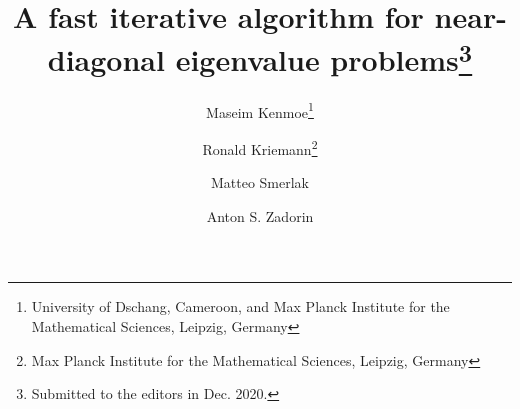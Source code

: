 

\usepackage{lipsum}
\usepackage{amsfonts}
\usepackage{graphicx}
\usepackage{epstopdf}
\usepackage{algorithmic}
\usepackage{cleveref}



\title{A fast iterative algorithm for  near-diagonal eigenvalue problems\thanks{Submitted to the editors in Dec. 2020. }}

\author{Maseim Kenmoe\thanks{University of Dschang, Cameroon, and Max Planck Institute for the Mathematical Sciences, Leipzig, Germany}
\and Ronald Kriemann\thanks{Max Planck Institute for the Mathematical Sciences, Leipzig, Germany}
\and Matteo Smerlak\footnotemark[3]
\and Anton S. Zadorin\footnotemark[3]}

\usepackage{amsopn}
\DeclareMathOperator{\diag}{diag}


